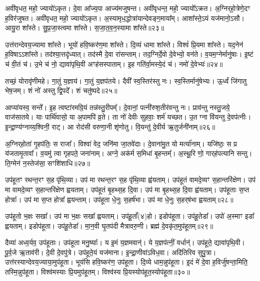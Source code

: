 अवी॑वृधत॒ महो॒ ज्यायो॑ऽकृत।
दे॒वा आ᳚ज्य॒पा आज्य॑मजुषन्त।
अवी॑वृधन्त॒ महो॒ ज्यायो᳚\-ऽक्रत।
अ॒ग्निर्‌\mbox{}हो॒त्रेणे॒दꣳ ह॒विर॑जुषत।
अवी॑वृधत॒ महो॒ ज्यायो॑ऽकृत।
अ॒स्यामृध॒द्धोत्रा॑यान्देवङ्ग॒माया᳚म्।
आशा᳚स्ते॒ऽयं यज॑मानो॒ऽसौ।
आयु॒रा शा᳚स्ते।
सु॒प्र॒जा॒स्त्वमा शा᳚स्ते।
स॒जा॒त॒व॒न॒स्यामा शा᳚स्ते॥२३॥\ip

उत्त॑रान्देवय॒ज्यामा शा᳚स्ते।
भूयो॑ हवि॒ष्कर॑ण॒मा शा᳚स्ते।
दि॒व्यं धामा शा᳚स्ते।
विश्वं॑ प्रि॒यमा शा᳚स्ते।
यद॒नेन॑ ह॒विषा\-ऽऽशा᳚स्ते।
तद॑श्या॒त्तदृ॑ध्यात्।
तद॑स्मै दे॒वा रा॑सन्ताम्।
तद॒ग्निर्दे॒वो दे॒वेभ्यो॒ वन॑ते।
व॒यम॒ग्नेर्मानु॑षाः।
इ॒ष्टं च॑ वी॒तं च॑।
उ॒भे च॑ नो॒ द्यावा॑पृथि॒वी अꣳह॑सस्पाताम्।
इ॒ह गति॑र्वा॒मस्ये॒दं च॑।
नमो॑ दे॒वेभ्यः॑॥२४॥\ip\anuvakamend[अ॒भ॒यं॒ कृता॑वकृता॒ग्निरि॒दꣳ ह॒विर॑जुषत महे॒न्द्र इ॒दꣳ ह॒विर॑जुषत सजातवन॒स्यामा शा᳚स्ते वी॒तं च॒ त्रीणि॑ च]

तच्छं॒ योरावृ॑णीमहे।
गा॒तुं य॒ज्ञाय॑।
गा॒तुं य॒ज्ञप॑तये।
दैवी᳚ स्व॒स्तिर॑स्तु नः।
स्व॒स्तिर्मानु॑षेभ्यः।
ऊ॒र्ध्वं जि॑गातु भेष॒जम्।
शं नो॑ अस्तु द्वि॒पदे᳚।
शं चतु॑ष्पदे॥२५॥\ip\anuvakamend[तच्छं॒ योर॒ष्टौ]

आप्या॑यस्व॒ सन्ते᳚।
इ॒ह त्वष्टा॑रमग्रि॒यं तन्न॑स्तु॒रीपम्᳚।
दे॒वानां॒ पत्नी॑रुश॒तीर॑वन्तु नः।
प्राव॑न्तु नस्तु॒जये॒ वाज॑सातये।
याः पार्थि॑वासो॒ या अ॒पामपि॑ व्र॒ते।
ता नो॑ देवीः सुहवाः॒ शर्म॑ यच्छत।
उ॒त ग्ना वि॑यन्तु दे॒वप॑त्नीः।
इ॒न्द्रा॒ण्य॑ग्नाय्य॒श्विनी॒ राट्।
आ रोद॑सी वरुणा॒नी शृ॑णोतु।
वि॒यन्तु॑ दे॒वीर्य ऋ॒तुर्जनी॑नाम्॥२६॥\ip

अ॒ग्निर्‌\mbox{}होता॑ गृ॒हप॑तिः॒ स राजा᳚।
विश्वा॑ वेद॒ जनि॑मा जा॒तवे॑दाः।
दे॒वाना॑मु॒त यो मर्त्या॑नाम्।
यजि॑ष्ठः॒ स प्र य॑जतामृ॒तावा᳚।
व॒यमु॑ त्वा गृहपते॒ जना॑नाम्।
अग्ने॒ अक॑र्म स॒मिधा॑ बृ॒हन्तम्᳚।
अ॒स्थू॒रि णो॒ गार्‌\mbox{}ह॑पत्यानि सन्तु।
ति॒ग्मेन॑ न॒स्तेज॑सा॒ सꣳशि॑शाधि॥२७॥\ip\anuvakamend[जनी॑नाम॒ष्टौ च॑]

उप॑हूतꣳ रथन्त॒रꣳ स॒ह पृ॑थि॒व्या।
उप॑ मा रथन्त॒रꣳ स॒ह पृ॑थि॒व्या ह्व॑यताम्।
उप॑हूतं वामदे॒व्यꣳ स॒हान्तरि॑क्षेण।
उप॑ मा वामदे॒व्यꣳ स॒हान्तरि॑क्षेण ह्वयताम्।
उप॑हूतं बृ॒हथ्स॒ह दि॒वा।
उप॑ मा बृ॒हथ्स॒ह दि॒वा ह्व॑यताम्।
उप॑हूताः स॒प्त होत्राः᳚।
उप॑ मा स॒प्त होत्रा᳚ ह्वयन्ताम्।
उप॑हूता धे॒नुः स॒हर्\mbox{}ष॑भा।
उप॑ मा धे॒नुः स॒हर्‌\mbox{}ष॑भा ह्वयताम्॥२८॥\ip

उप॑हूतो भ॒क्षः सखा᳚।
उप॑ मा भ॒क्षः सखा᳚ ह्वयताम्।
उप॑हू॒ताँ(४)हो।
इडोप॑हूता।
उप॑हू॒तेडा᳚।
उपो॑ अ॒स्माꣳ इडा᳚ ह्वयताम्।
इडोप॑हूता।
उप॑हू॒तेडा᳚।
मा॒न॒वी घृ॒तप॑दी मैत्रावरु॒णी।
ब्रह्म॑ दे॒वकृ॑त॒मुप॑हूतम्॥२९॥\ip

दैव्या॑ अध्व॒र्यव॒ उप॑हूताः।
उप॑हूता मनु॒ष्याः᳚।
य इ॒मं य॒ज्ञमवान्॑।
ये य॒ज्ञप॑त्नीं॒ वर्धान्॑।
उप॑हूते॒ द्यावा॑पृथि॒वी।
पू॒र्व॒जे ऋ॒ताव॑री।
दे॒वी दे॒वपु॑त्रे।
उप॑हूते॒यं यज॑माना।
इ॒न्द्रा॒णीवा॑\-ऽविध॒वा।
अदि॑तिरिव सुपु॒त्रा।
उत्त॑रस्यान्देवय॒ज्याया॒मुप॑हूता।
भूय॑सि हवि॒ष्कर॑ण॒ उप॑हूता।
दि॒व्ये धाम॒न्नुप॑हूता।
इ॒दं मे॑ दे॒वा ह॒विर्जु॑षन्ता॒मिति॒ तस्मि॒न्नुप॑हूता।
विश्व॑मस्याः प्रि॒यमुप॑हूतम्।
विश्व॑स्य प्रि॒यस्योप॑हूत॒स्योप॑हूता॥३०॥\ip{}


